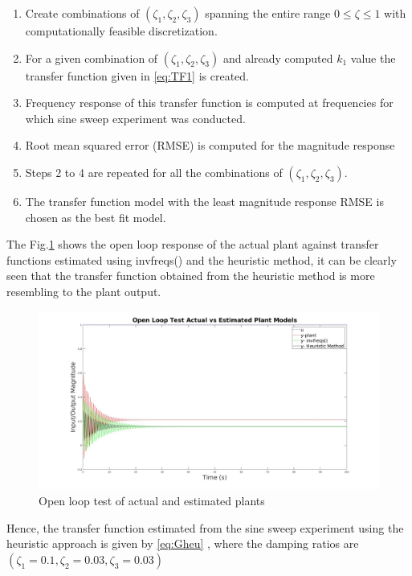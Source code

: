 \documentclass[11pt,usenames]{article}
\begin{document}
\begin{enumerate}
	\item Create combinations of $ (\zeta_{1}, \zeta_{2}, \zeta_{3}) $ spanning the entire range  $ 0 \leq \zeta \leq 1 $ with computationally feasible discretization.
	\item For a given combination of $ (\zeta_{1}, \zeta_{2}, \zeta_{3}) $ and already computed $k_{1}$ value the transfer function given in \eqref{eq:TF1} is created.
	\item Frequency response of this transfer function is computed at frequencies for which sine sweep experiment was conducted.
	\item Root mean squared error (RMSE) is computed for the magnitude response
	\item Steps 2 to 4 are repeated for all the combinations of $ (\zeta_{1}, \zeta_{2}, \zeta_{3}) $.
	\item The transfer function model with the least magnitude response RMSE is chosen as the best fit model.
\end{enumerate}

The Fig.\ref{fig:OpenLoopk1Bias} shows the open loop response of the actual plant against transfer functions estimated using invfreqs() and the heuristic method, it can be clearly seen that the transfer function obtained from the heuristic method is more resembling to the plant output. 

\begin{figure}[htpb]
	\centering
	\includegraphics[width=1\columnwidth]{OpenLoopk1Bias.jpg}
	\caption{Open loop test of actual and estimated plants }
	\label{fig:OpenLoopk1Bias}
\end{figure}

Hence, the transfer function estimated from the sine sweep experiment using the heuristic approach is given by \eqref{eq:Gheu} , where the damping ratios are $ (\zeta_{1}=0.1, \zeta_{2}=0.03, \zeta_{3}=0.03) $
\end{document}
